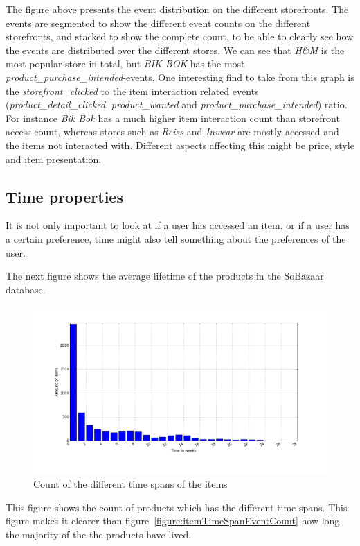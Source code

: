 The figure above presents the event distribution on the different storefronts.
The events are segmented to show the different event counts on the different
storefronts, and stacked to show the complete count, to be able to clearly see
how the events are distributed over the different stores.  We can see that
\emph{H\&M} is the most popular store in total, but \emph{BIK BOK} has the most
\emph{product\_purchase\_intended}-events.  One interesting find to take from
this graph is the \emph{storefront\_clicked} to the item interaction related
events (\emph{product\_detail\_clicked}, \emph{product\_wanted} and
\emph{product\_purchase\_intended}) ratio.  For instance \emph{Bik Bok} has a
much higher item interaction count than storefront access count, whereas stores
such as \emph{Reiss} and \emph{Inwear} are mostly accessed and the items not
interacted with.  Different aspects affecting this might be price, style and
item presentation.

\subsection{Time properties}

It is not only important to look at if a user has accessed an item, or if a
user has a certain preference, time might also tell something about the
preferences of the user.

The next figure shows the average lifetime of the products in the SoBazaar
database.

\begin{figure}[H]
  \centering
  \includegraphics[width=5in]{image/itemTimespansdistribution.png}
  \caption{Count of the different time spans of the items}
  \label{figure:itemLifes}
\end{figure}

This figure shows the count of products which has the different time spans.
This figure makes it clearer than figure~\ref{figure:itemTimeSpanEventCount}
how long the majority of the the products have lived.

